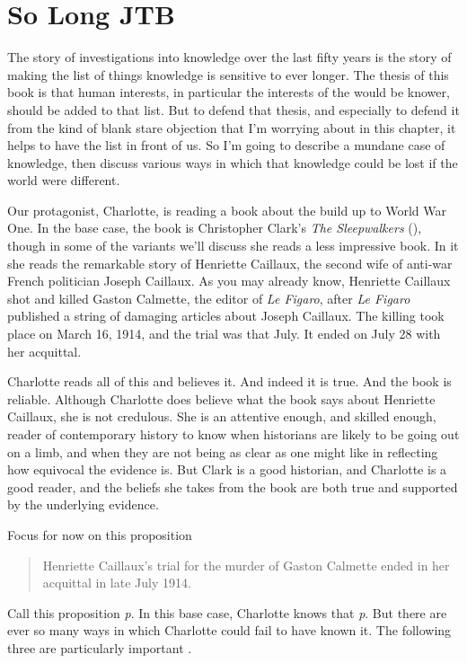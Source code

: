 \documentclass[
  12pt,
  letterpaper,
]{scrbook}
\begin{document}
\section{So Long JTB}\label{sec-gettier}

The story of investigations into knowledge over the last fifty years is
the story of making the list of things knowledge is sensitive to ever
longer. The thesis of this book is that human interests, in particular
the interests of the would be knower, should be added to that list. But
to defend that thesis, and especially to defend it from the kind of
blank stare objection that I'm worrying about in this chapter, it helps
to have the list in front of us. So I'm going to describe a mundane case
of knowledge, then discuss various ways in which that knowledge could be
lost if the world were different.

Our protagonist, Charlotte, is reading a book about the build up to
World War One. In the base case, the book is Christopher Clark's
\emph{The Sleepwalkers} (), though
in some of the variants we'll discuss she reads a less impressive book.
In it she reads the remarkable story of Henriette Caillaux, the second
wife of anti-war French politician Joseph Caillaux. As you may already
know, Henriette Caillaux shot and killed Gaston Calmette, the editor of
\emph{Le Figaro}, after \emph{Le Figaro} published a string of damaging
articles about Joseph Caillaux. The killing took place on March 16,
1914, and the trial was that July. It ended on July 28 with her
acquittal.

Charlotte reads all of this and believes it. And indeed it is true. And
the book is reliable. Although Charlotte does believe what the book says
about Henriette Caillaux, she is not credulous. She is an attentive
enough, and skilled enough, reader of contemporary history to know when
historians are likely to be going out on a limb, and when they are not
being as clear as one might like in reflecting how equivocal the
evidence is. But Clark is a good historian, and Charlotte is a good
reader, and the beliefs she takes from the book are both true and
supported by the underlying evidence.

Focus for now on this proposition

\begin{quote}
Henriette Caillaux's trial for the murder of Gaston Calmette ended in
her acquittal in late July 1914.
\end{quote}

Call this proposition \emph{p}. In this base case, Charlotte knows that
\emph{p}. But there are ever so many ways in which Charlotte could fail
to have known it. The following three are particularly important .
\end{document}
